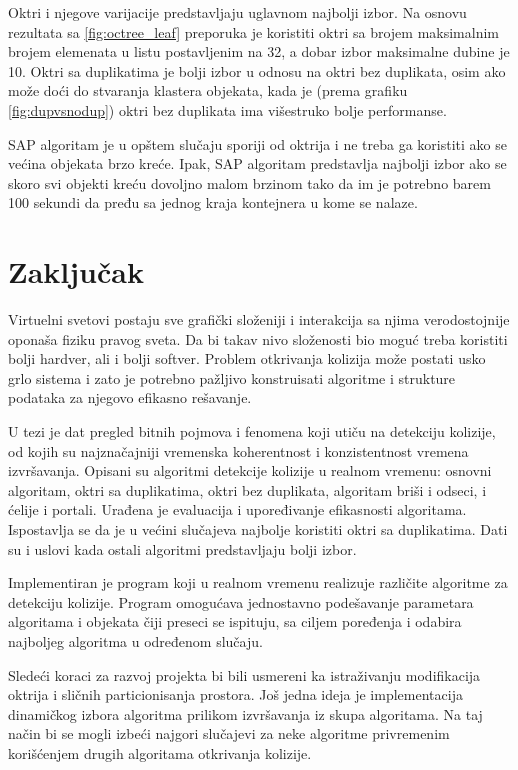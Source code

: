 \documentclass[12pt,oneside]{memoir}
\begin{document}
Oktri i njegove varijacije predstavljaju uglavnom najbolji izbor.
Na osnovu rezultata sa \ref{fig:octree_leaf} preporuka je koristiti oktri sa brojem maksimalnim brojem elemenata u listu 
postavljenim na 32, a dobar izbor maksimalne dubine je 10. 
Oktri sa duplikatima je bolji izbor u odnosu na oktri bez duplikata, osim ako može doći do stvaranja klastera objekata, kada
je (prema grafiku \ref{fig:dupvsnodup}) oktri bez duplikata ima višestruko bolje performanse.

SAP algoritam je u opštem slučaju sporiji od oktrija i ne treba ga koristiti ako se većina objekata 
brzo kreće.
Ipak, SAP algoritam predstavlja najbolji izbor ako se skoro svi objekti kreću dovoljno malom brzinom 
tako da im je potrebno barem 100 sekundi da pređu sa jednog kraja kontejnera u kome se nalaze.


\chapter{Zaključak}
\label{sec:zakljucak}

Virtuelni svetovi postaju sve  grafički složeniji i  interakcija sa njima verodostojnije oponaša fiziku pravog sveta.
Da bi takav nivo složenosti bio moguć treba koristiti bolji hardver, ali i bolji softver. 
Problem otkrivanja kolizija može postati usko grlo sistema i zato je potrebno pažljivo konstruisati 
algoritme i strukture podataka za njegovo efikasno rešavanje.

U tezi je dat pregled bitnih pojmova i fenomena koji utiču na detekciju kolizije, 
od kojih su najznačajniji vremenska koherentnost i konzistentnost vremena izvršavanja.
Opisani su algoritmi detekcije kolizije u realnom vremenu: osnovni algoritam, oktri sa duplikatima, oktri bez duplikata,
algoritam briši i odseci, i ćelije i portali. 
Urađena je evaluacija i upoređivanje efikasnosti algoritama.
Ispostavlja se da je u većini slučajeva najbolje koristiti oktri sa duplikatima.
Dati su i uslovi kada ostali algoritmi predstavljaju bolji izbor.

Implementiran je program koji u realnom vremenu realizuje različite algoritme
za detekciju kolizije.
Program omogućava jednostavno podešavanje parametara algoritama i objekata čiji preseci se ispituju,
sa ciljem poređenja i odabira najboljeg algoritma u određenom slučaju.

Sledeći koraci za razvoj projekta bi bili usmereni ka istraživanju modifikacija oktrija 
i sličnih particionisanja prostora.
Još jedna ideja je implementacija dinamičkog izbora algoritma prilikom izvršavanja iz skupa algoritama.
Na taj način bi se mogli izbeći najgori slučajevi za neke algoritme privremenim korišćenjem drugih  
algoritama otkrivanja kolizije.
\end{document}
